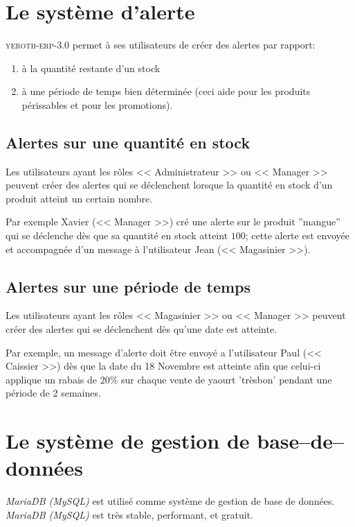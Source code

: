 \documentclass[a4paper, 10pt, twocolumn]{article}
\newcommand{\yeren}{\textsc{yeroth-erp-3.0}\xspace}
\newcommand{\manager}{<< Manager >>\xspace}
\newcommand{\caissier}{<< Caissier >>\xspace}
\newcommand{\administrateur}{<< Administrateur >>\xspace}
\newcommand{\magasinier}{<< Magasinier >>\xspace}
\newcommand{\mariadbmysql}{\emph{MariaDB (MySQL)}\xspace}
\begin{document}
\vspace{-1em}
\section{Le syst\`eme d'alerte}
\vspace{-0.5em}
\yeren permet \`a ses utilisateurs de cr\'eer
des alertes par rapport:
\begin{enumerate}[1)]
	\itemsep -0.5em
	\item \`a la quantit\'e restante d'un stock
	\item \`a une p\'eriode de temps bien
		d\'etermin\'ee (ceci aide pour les
		produits p\'erissables et pour les promotions).
\end{enumerate}

\vspace{-1em}

\subsection{Alertes sur une quantit\'e en stock}
\vspace{-0.1em}
Les utilisateurs ayant les r\^oles \administrateur ou
\manager peuvent cr\'eer des alertes qui se
d\'eclenchent lorsque la quantit\'e en stock d'un produit
atteint un certain nombre.

Par exemple Xavier (\manager) cr\'e une alerte sur le
produit ''mangue'' qui se d\'eclenche d\`es que sa quantit\'e
en stock atteint $100$; cette alerte est envoy\'ee et
accompagn\'ee d'un message \`a l'utilisateur Jean (\magasinier).

\vspace{-1em}

\subsection{Alertes sur une p\'eriode de temps}
\vspace{-0.1em}
Les utilisateurs ayant les r\^oles \magasinier ou
\manager peuvent cr\'eer des alertes qui se
d\'eclenchent d\`es qu'une date est atteinte.

Par exemple, un message d'alerte doit \^etre envoy\'e
a l'utilisateur Paul (\caissier) d\`es que
la date du 18 Novembre est atteinte afin que celui-ci
applique un rabais de $20\%$ sur chaque vente de
yaourt 'tr\`esbon' pendant une p\'eriode de 2 semaines.

\vspace{-1.1em}
\section{Le syst\`eme de gestion de base--de--donn\'ees}
\vspace{-0.3em}
\mariadbmysql est utilis\'e comme syst\`eme de gestion
de base de donn\'ees. \mariadbmysql est tr\`es stable,
performant, et gratuit.
\end{document}
